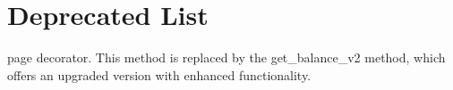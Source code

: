 \chapter{Deprecated List}
\hypertarget{deprecated}{}\label{deprecated}

\begin{DoxyRefList}
\item[page \doxylink{index}{Credit Card Management API (Version 1.5)} ]\label{deprecated__deprecated000001}%
%
decorator. This method is replaced by the get\+\_\+balance\+\_\+v2 method, which offers an upgraded version with enhanced functionality.
\end{DoxyRefList}